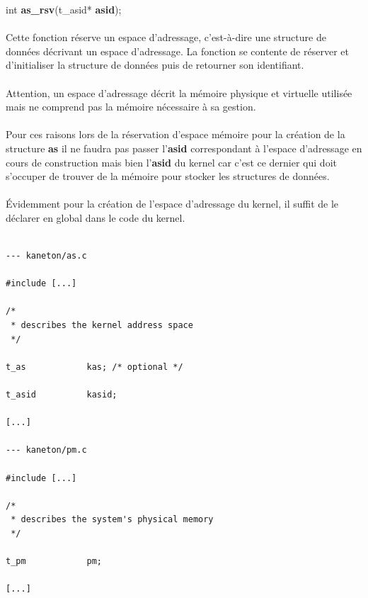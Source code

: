 \documentclass[10pt,a4wide]{article}
\begin{document}
\hspace{1.5cm}int \textbf{as\_rsv}(t\_asid* \textbf{asid});

\paragraph{}

Cette fonction r\'eserve un espace d'adressage, c'est-\`a-dire une structure
de donn\'ees d\'ecrivant un espace d'adressage. La fonction se contente
de r\'eserver et d'initialiser la structure de donn\'ees puis de retourner
son identifiant.

\paragraph{}

Attention, un espace d'adressage d\'ecrit la m\'emoire physique et
virtuelle utilis\'ee mais ne comprend pas la m\'emoire n\'ecessaire
\`a sa gestion.

\paragraph{}

Pour ces raisons lors de la r\'eservation d'espace m\'emoire pour la
cr\'eation de la structure \textbf{as} il ne faudra pas passer l'\textbf{asid}
correspondant \`a l'espace d'adressage en cours de construction mais
bien l'\textbf{asid} du kernel car c'est ce dernier qui doit s'occuper
de trouver de la m\'emoire pour stocker les structures de donn\'ees.

\paragraph{}

\'Evidemment pour la cr\'eation de l'espace d'adressage du kernel, il suffit
de le d\'eclarer en global dans le code du kernel.

\begin{verbatim}

--- kaneton/as.c

#include [...]

/*
 * describes the kernel address space
 */

t_as            kas; /* optional */

t_asid          kasid;

[...]

--- kaneton/pm.c

#include [...]

/*
 * describes the system's physical memory
 */

t_pm            pm;

[...]

\end{verbatim}
\end{document}
